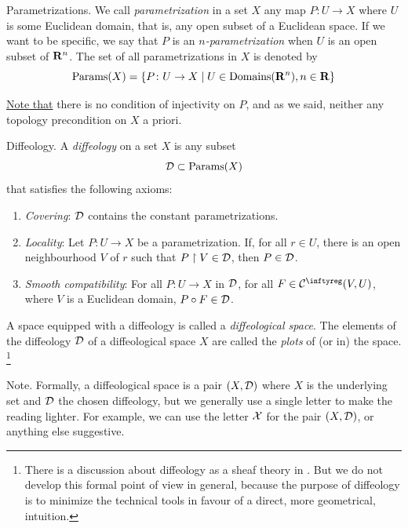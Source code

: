 \begin{Article}{Parametrizations.}
  We call \emph{parametrization} in a set $X$ any map $P \colon U \to X$ where $U$ is some Euclidean domain,
  that is,
  any open subset of a Euclidean space.
  If we want to be specific,
  we say that $P$ is an \emph{$n$-parametrization} when $U$ is an open subset of $\mathbf{R}^n$.
  The set of all parametrizations in $X$ is denoted by
  $$%
    \Params(X) = \{ P \colon U \to X \mid U \in \Domains(\RR^n), n \in \RR \}
    $$%
\end{Article}
%
\uline{Note that} there is no condition of injectivity on $P$,
and as we said,
neither any topology precondition on $X$ a priori.

\begin{Article}{Diffeology.}
  A \emph{diffeology} on a set $X$ is any subset
  $$%
    \cD \subset \Params(X)
    $$%
  that satisfies the following axioms:
  \begin{enumerate}
    \item[1.] \emph{Covering}: $\mathcal{D}$ contains the constant parametrizations.
    \item[2.] \emph{Locality}: Let $P \colon U \to X$ be a parametrization.
    If,
    for all $r \in U$,
    there is an open neighbourhood $V$ of $r$ such that $P \restriction V \in \mathcal{D}$,
    then $P \in \mathcal{D}$.
    \item[3.] \emph{Smooth compatibility}: For all $P \colon U \to X$ in $\mathcal{D}$,
    for all $F \in \Cinfty(V,U)$,
    where $V$ is a Euclidean domain,
    $P \circ F \in \mathcal{D}$.
  \end{enumerate}
  A space equipped with a diffeology is called a \emph{diffeological space}.
  The elements of the diffeology $\mathcal{D}$ of a diffeological space $X$ are called the \emph{plots} of (or in) the space.%
  \footnote{There is a discussion about diffeology as a sheaf theory in \cite[Annex]{Igl87}.
  But we do not develop this formal point of view in general,
  because the purpose of diffeology is to minimize the technical tools in favour of a direct,
  more geometrical,
  intuition.}
\end{Article}

\begin{Article}{Note.}{}
  Formally,
  a diffeological space is a pair $(X,\mathcal{D})$ where $X$ is the underlying set and $\mathcal{D}$ the chosen diffeology,
  but we generally use a single letter to make the reading lighter.
  For example,
  we can use the letter $\mathcal{X}$ for the pair $(X,\mathcal{D})$,
  or anything else suggestive.
\end{Article}

